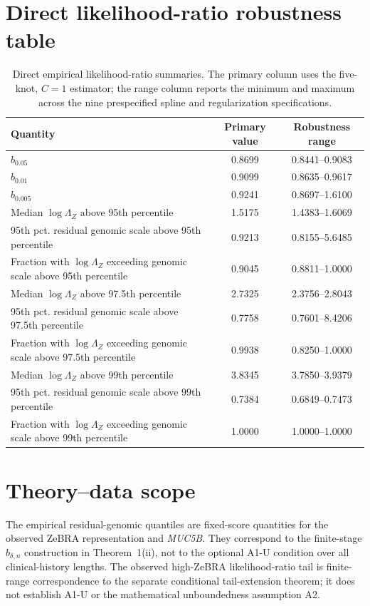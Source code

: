\documentclass[10pt]{article}
\begin{document}
\section*{Direct likelihood-ratio robustness table}
\begin{table}[!t]
\caption{Direct empirical likelihood-ratio summaries. The primary column uses the five-knot, $C=1$ estimator; the range column reports the minimum and maximum across the nine prespecified spline and regularization specifications.}
\label{tab:empirical-lr-summary}\centering\small
\begin{tabular}{lcc}
\toprule
Quantity & Primary value & Robustness range\\
\midrule
$\widehat b_{0.05}$ & 0.8699 & 0.8441--0.9083\\
$\widehat b_{0.01}$ & 0.9099 & 0.8635--0.9617\\
$\widehat b_{0.005}$ & 0.9241 & 0.8697--1.6100\\
Median $\log \Lambda_Z$ above 95th percentile & 1.5175 & 1.4383--1.6069\\
95th pct. residual genomic scale above 95th percentile & 0.9213 & 0.8155--5.6485\\
Fraction with $\log\Lambda_Z$ exceeding genomic scale above 95th percentile & 0.9045 & 0.8811--1.0000\\
Median $\log \Lambda_Z$ above 97.5th percentile & 2.7325 & 2.3756--2.8043\\
95th pct. residual genomic scale above 97.5th percentile & 0.7758 & 0.7601--8.4206\\
Fraction with $\log\Lambda_Z$ exceeding genomic scale above 97.5th percentile & 0.9938 & 0.8250--1.0000\\
Median $\log \Lambda_Z$ above 99th percentile & 3.8345 & 3.7850--3.9379\\
95th pct. residual genomic scale above 99th percentile & 0.7384 & 0.6849--0.7473\\
Fraction with $\log\Lambda_Z$ exceeding genomic scale above 99th percentile & 1.0000 & 1.0000--1.0000\\
\bottomrule
\end{tabular}
\end{table}

\section*{Theory--data scope}
The empirical residual-genomic quantiles are fixed-score quantities for the observed ZeBRA representation and \textit{MUC5B}. They correspond to the finite-stage $b_{\delta,n}$ construction in Theorem~1(ii), not to the optional A1-U condition over all clinical-history lengths. The observed high-ZeBRA likelihood-ratio tail is finite-range correspondence to the separate conditional tail-extension theorem; it does not establish A1-U or the mathematical unboundedness assumption A2.
\end{document}
